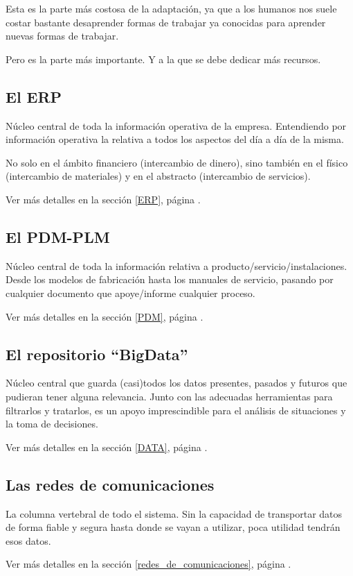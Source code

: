 \documentclass[spanish,12pt,a4paper,final,oneside]{book}
\begin{document}
Esta es la parte más costosa de la adaptación, ya que a los humanos nos suele costar bastante desaprender formas de trabajar ya conocidas para aprender nuevas formas de trabajar.

Pero es la parte más importante. Y a la que se debe dedicar más recursos.

\subsection{El ERP}
Núcleo central de toda la información operativa de la empresa. Entendiendo por información operativa la relativa a todos los aspectos del día a día de la misma. 

No solo en el ámbito financiero (intercambio de dinero), sino también en el físico (intercambio de materiales) y en el abstracto (intercambio de servicios).

Ver más detalles en la sección \ref{ERP}, página \pageref{ERP}.


\subsection{El PDM-PLM}
Núcleo central de toda la información relativa a producto/servicio/instalaciones. Desde los modelos de fabricación hasta los manuales de servicio, pasando por cualquier documento que apoye/informe cualquier proceso.


Ver más detalles en la sección \ref{PDM}, página \pageref{PDM}.


\subsection{El repositorio ``BigData''}
Núcleo central que guarda (casi)todos los datos presentes, pasados y futuros que pudieran tener alguna relevancia. Junto con las adecuadas herramientas para filtrarlos y tratarlos, es un apoyo imprescindible para el análisis de situaciones y la toma de decisiones.

Ver más detalles en la sección \ref{DATA}, página \pageref{DATA}.


\subsection{Las redes de comunicaciones}
La columna vertebral de todo el sistema. Sin la capacidad de transportar datos de forma fiable y segura hasta donde se vayan a utilizar, poca utilidad tendrán esos datos.

Ver más detalles en la sección \ref{redes_de_comunicaciones}, página \pageref{redes_de_comunicaciones}.
\end{document}
